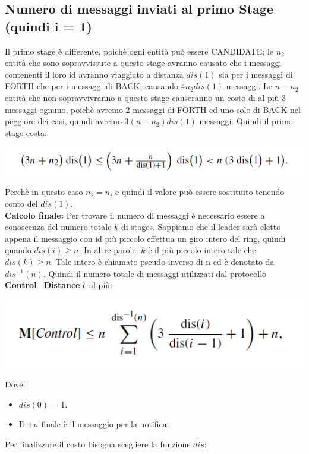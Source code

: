 \subsection{Numero di messaggi inviati al primo Stage (quindi i = 1)}
Il primo stage è differente, poichè ogni entità può essere CANDIDATE; le $n_2$ entità che sono sopravvissute a questo stage avranno causato che i messaggi contenenti il loro id avranno viaggiato a distanza $dis(1)$ sia per i messaggi di FORTH che per i messaggi di BACK, causando $4n_2dis(1)$ messaggi. Le $n-n_2$ entità che non sopravvivranno a  questo stage causeranno un costo di al più 3 messaggi ognuno, poichè avremo 2 messaggi di FORTH ed uno solo di BACK nel peggiore dei casi, quindi avremo $3(n - n_2)dis(1)$ messaggi. Quindi il primo stage costa:
\begin{center}
    \includegraphics[scale=0.6]{aa/cc.png}
\end{center}
Perchè in questo caso $n_2 = n_i$ e quindi il valore può essere sostituito tenendo conto del $dis(1)$.\\
\textbf{Calcolo finale:}
Per trovare il numero di messaggi è necessario essere a conoscenza del numero totale $k$ di stages. Sappiamo che il leader sarà eletto appena il messaggio con id più piccolo effettua un giro intero del ring, quindi quando $dis(i) \geq n$. In altre parole, $k$ è il più piccolo intero tale che $dis(k) \geq n$. Tale intero è chiamato pseudo-inverso di n ed è denotato da $dis^{-1}(n)$.
Quindi il numero totale di messaggi utilizzati dal protocollo \textbf{Control\_Distance} è al più:
\begin{center}
    \includegraphics[scale=0.6]{aa/dd.png}
\end{center}
Dove:
\begin{itemize}
    \item $dis(0)$ = 1.
    \item Il $+ n$ finale è il messaggio per la notifica.
\end{itemize}

Per finalizzare il costo bisogna scegliere la funzione $dis$:\\

